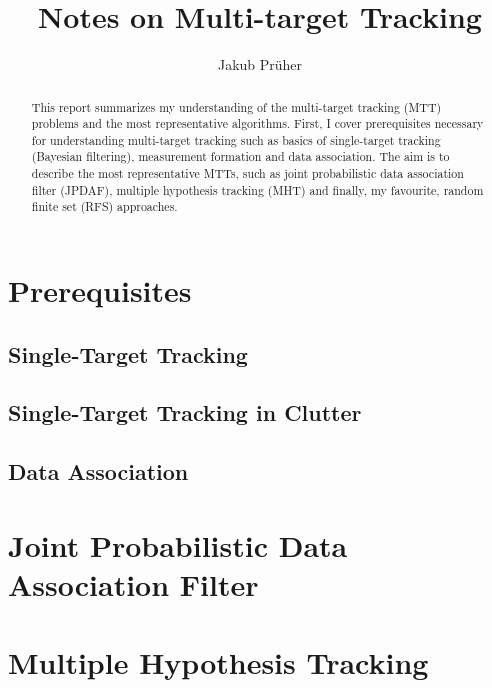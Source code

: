 \documentclass[a4paper]{scrreprt}
\title{Notes on Multi-target Tracking}
\author{Jakub Prüher}
\theoremstyle{theorem}
\theoremstyle{definition}
\begin{document}
\maketitle

\begin{abstract}
	This report summarizes my understanding of the multi-target tracking (MTT) problems and the most representative algorithms. 
	First, I cover prerequisites necessary for understanding multi-target tracking such as basics of single-target tracking (Bayesian filtering), measurement formation and data association.
	The aim is to describe the most representative MTTs, such as joint probabilistic data association filter (JPDAF), multiple hypothesis tracking (MHT) and finally, my favourite, random finite set (RFS) approaches.
\end{abstract}




\chapter{Prerequisites}\label{ch:prerequisites}


\section{Single-Target Tracking}\label{sec:single-target_tracking}


\section{Single-Target Tracking in Clutter}\label{sec:single-target_tracking_in_clutter}


\section{Data Association}\label{sec:data_association}




\chapter{Joint Probabilistic Data Association Filter}\label{ch:jpda_filter}




\chapter{Multiple Hypothesis Tracking}\label{ch:multiple_hypothesis_tracking}
\end{document}
